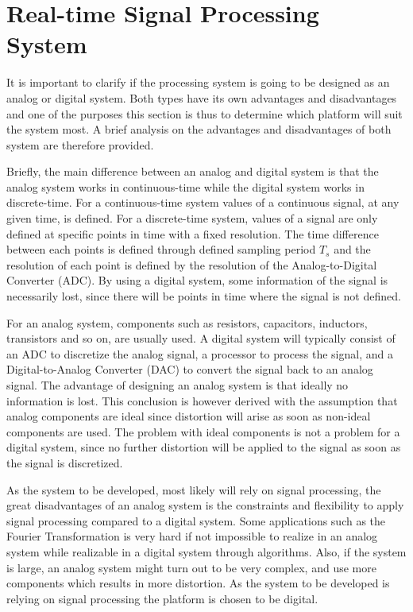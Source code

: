 \section{Real-time Signal Processing System}

It is important to clarify if the processing system is going to be designed as an analog or digital system. Both types have its own advantages and disadvantages and one of the purposes this section is thus to determine which platform will suit the system most. A brief analysis on the advantages and disadvantages of both system are therefore provided. 

Briefly, the main difference between an analog and digital system is that the analog system works in continuous-time while the digital system works in discrete-time. For a continuous-time system values of a continuous signal, at any given time, is defined. For a discrete-time system, values of a signal are only defined at specific points in time with a fixed resolution. The time difference between each points is defined through defined sampling period $T_s$ and the resolution of each point is defined by the resolution of the Analog-to-Digital Converter (ADC). By using a digital system, some information of the signal is necessarily lost, since there will be points in time where the signal is not defined.

For an analog system, components such as resistors, capacitors, inductors, transistors and so on, are usually used. A digital system will typically consist of an ADC to discretize the analog signal, a processor to process the signal, and a Digital-to-Analog Converter (DAC) to convert the signal back to an analog signal. The advantage of designing an analog system is that ideally no information is lost. This conclusion is however derived with the assumption that analog components are ideal since distortion will arise as soon as non-ideal components are used. The problem with ideal components is not a problem for a digital system, since no further distortion will be applied to the signal as soon as the signal is discretized.

As the system to be developed, most likely will rely on signal processing, the great disadvantages of an analog system is the constraints and flexibility to apply signal processing compared to a digital system. Some applications such as the Fourier Transformation is very hard if not impossible to realize in an analog system while realizable in a digital system through algorithms. Also, if the system is large, an analog system might turn out to be very complex, and use more components which results in more distortion. As the system to be developed is relying on signal processing the platform is chosen to be digital.

